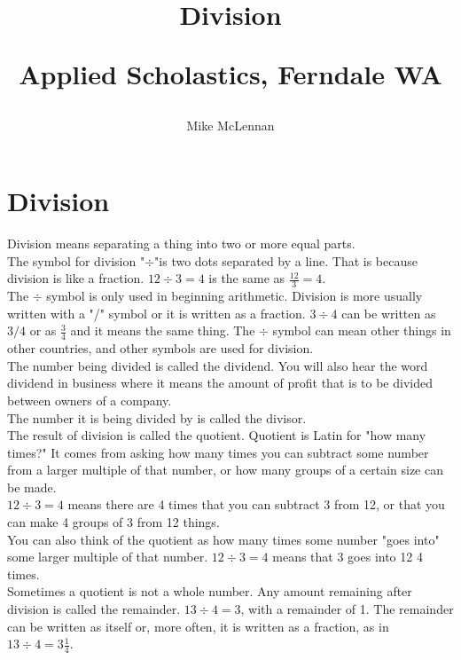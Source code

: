 \documentclass{article}
\author{Mike McLennan}
\date{}
\title{Division\\
\vspace{28pt}
\begin{normalsize}Applied Scholastics, Ferndale WA \end{normalsize}}
\begin{document}
\maketitle
\pagebreak
\tableofcontents

\pagebreak

\section{Division}

Division means separating a thing into two or more equal parts.\\

The symbol for division "$\div$"is two dots separated by a line. That is because division is like a fraction. $12 \div 3 = 4$ is the same as $\frac{12}{3}=4$.\\

The $\div$ symbol is only used in beginning arithmetic. Division is more usually written with a "/" symbol or it is written as a fraction. $3 \div 4$ can be written as $3/4$ or as $\frac{3}{4}$ and it means the same thing. The $\div$ symbol can mean other things in other countries, and other symbols are used for division.\\

The number being divided is called the dividend. You will also hear the word dividend in business where it means the amount of profit that is to be divided between owners of a company.\\

The number it is being divided by is called the divisor.\\

The result of division is called the quotient. Quotient is Latin for "how many times?" It comes from asking how many times you can subtract some number from a larger multiple of that number, or how many groups of a certain size can be made.\\

$12 \div 3 = 4$ means there are 4 times that you can subtract 3 from 12, or that you can make 4 groups of 3 from 12 things.\\

You can also think of the quotient as how many times some number "goes into" some larger multiple of that number. $12 \div 3 = 4$ means that 3 goes into 12 4 times.\\

Sometimes a quotient is not a whole number. Any amount remaining after division is called the remainder. $13 \div 4 = 3$, with a remainder of 1. The remainder can be written as itself or, more often, it is written as a fraction, as in $13 \div 4 = 3 \frac{1}{4}$.
\end{document}
